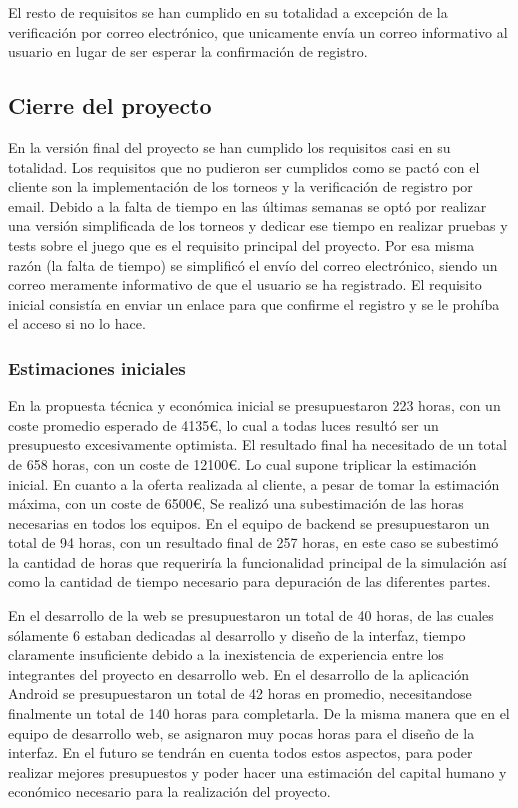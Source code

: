 \documentclass{article}
\begin{document}
El resto de requisitos se han cumplido en su totalidad a excepción de la verificación por correo electrónico, que unicamente envía un correo informativo al usuario en lugar de ser esperar la confirmación de registro.

\subsection{Cierre del proyecto}
En la versión final del proyecto se han cumplido los requisitos casi en su totalidad. Los requisitos que no pudieron ser cumplidos como se pactó con el cliente son la implementación de los torneos y la verificación de registro por email. Debido a la falta de tiempo en las últimas semanas se optó por realizar una versión simplificada de los torneos y dedicar ese tiempo en realizar pruebas y tests sobre el juego que es el requisito principal del proyecto. Por esa misma razón (la falta de tiempo) se simplificó el envío del correo electrónico, siendo un correo meramente informativo de que el usuario se ha registrado. El requisito inicial consistía en enviar un enlace para que confirme el registro y se le prohíba el acceso si no lo hace.
\subsubsection*{Estimaciones iniciales}
En la propuesta técnica y económica inicial se presupuestaron 223 horas, con un coste promedio esperado de 4135€, lo cual a todas luces resultó ser un presupuesto excesivamente optimista.
El resultado final ha necesitado de un total de 658 horas, con un coste de 12100€. Lo cual supone triplicar la estimación inicial. En cuanto a la oferta realizada al cliente, a pesar de tomar la estimación máxima, con un coste de 6500€,
Se realizó una subestimación de las horas necesarias en todos los equipos. En el equipo de backend se presupuestaron un total de 94 horas, con un resultado final de 257 horas, en este caso se subestimó la cantidad de horas que requeriría la funcionalidad principal de la simulación así como la cantidad de tiempo necesario para depuración de las diferentes partes.

En el desarrollo de la web se presupuestaron un total de 40 horas, de las cuales sólamente 6 estaban dedicadas al desarrollo y diseño de la interfaz, tiempo claramente insuficiente debido a la inexistencia de experiencia entre los integrantes del proyecto en desarrollo web.
En el desarrollo de la aplicación Android se presupuestaron un total de 42 horas en promedio, necesitandose finalmente un total de 140 horas para completarla. De la misma manera que en el equipo de desarrollo web, se asignaron muy pocas horas para el diseño de la interfaz.
En el futuro se tendrán en cuenta todos estos aspectos, para poder realizar mejores presupuestos y poder hacer una estimación del capital humano y económico necesario para la realización del proyecto.
\end{document}
